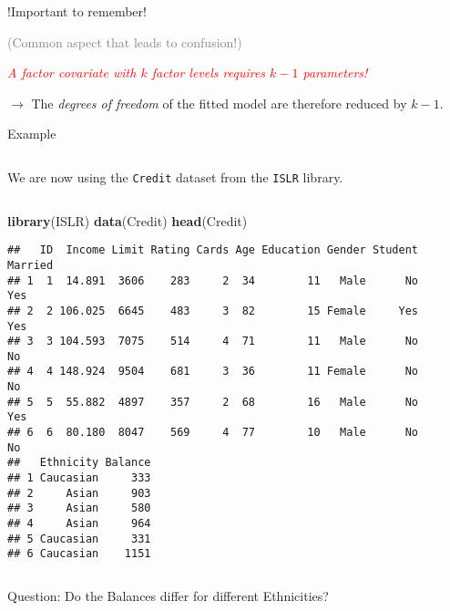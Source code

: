 \documentclass[10pt,ignorenonframetext,]{beamer}
\newenvironment{Shaded}{\begin{snugshade}}{\end{snugshade}}
\newcommand{\KeywordTok}[1]{\textcolor[rgb]{0.13,0.29,0.53}{\textbf{#1}}}
\newcommand{\NormalTok}[1]{#1}
\begin{document}
\begin{frame}

\begin{block}{!Important to remember!}

\textcolor{gray}{(Common aspect that leads to confusion!)}

\vspace{10mm}

\emph{\textcolor{red}{A factor covariate with $k$ factor levels requires $k-1$ parameters!}}
\vspace{2mm}

\(\rightarrow\) The \emph{degrees of freedom} of the fitted model are
therefore reduced by \(k-1\).

\end{block}

\end{frame}

\begin{frame}[fragile]

\begin{block}{Example}

\(~\)

We are now using the \texttt{Credit} dataset from the \texttt{ISLR}
library.

\(~\)

\scriptsize

\begin{Shaded}
\begin{Highlighting}[]
\KeywordTok{library}\NormalTok{(ISLR)}
\KeywordTok{data}\NormalTok{(Credit)}
\KeywordTok{head}\NormalTok{(Credit)}
\end{Highlighting}
\end{Shaded}

\begin{verbatim}
##   ID  Income Limit Rating Cards Age Education Gender Student Married
## 1  1  14.891  3606    283     2  34        11   Male      No     Yes
## 2  2 106.025  6645    483     3  82        15 Female     Yes     Yes
## 3  3 104.593  7075    514     4  71        11   Male      No      No
## 4  4 148.924  9504    681     3  36        11 Female      No      No
## 5  5  55.882  4897    357     2  68        16   Male      No     Yes
## 6  6  80.180  8047    569     4  77        10   Male      No      No
##   Ethnicity Balance
## 1 Caucasian     333
## 2     Asian     903
## 3     Asian     580
## 4     Asian     964
## 5 Caucasian     331
## 6 Caucasian    1151
\end{verbatim}

\(~\)

\normalsize

Question: Do the Balances differ for different Ethnicities?

\end{block}

\end{frame}
\end{document}

